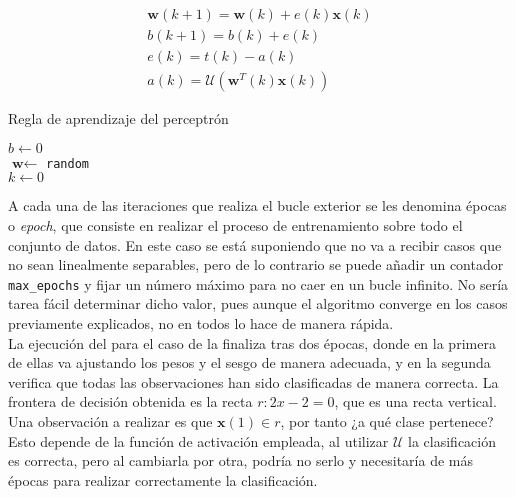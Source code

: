 		\begin{equation}
			\label{eq:perceptron}
			\begin{gathered}
				\textbf{w}(k+1) = \textbf{w}(k) + e(k)\textbf{x}(k)\\
				b(k+1) = b(k) + e(k)\\
				e(k) = t(k) - a(k)\\
				a(k) = \mathcal{U}(\textbf{w}^T(k)\textbf{x}(k))
			\end{gathered}
		\end{equation}
		
		
		\begin{algorithm}[!h]
			\DontPrintSemicolon
			
			\caption{Regla de aprendizaje del perceptrón}
			\label{algo:perceptron}
			
			$b \gets 0$\\
			$\textbf{w} \gets$ \texttt{random}\\
			$k \gets 0$\\
		\end{algorithm}
		
		A cada una de las iteraciones que realiza el bucle exterior se les denomina épocas o \textit{epoch}, que consiste en realizar el proceso de entrenamiento sobre todo el conjunto de datos. En este caso se está suponiendo que no va a recibir casos que no sean linealmente separables, pero de lo contrario se puede añadir un contador \texttt{max\_epochs} y fijar un número máximo para no caer en un bucle infinito. No sería tarea fácil determinar dicho valor, pues aunque el algoritmo converge en los casos previamente explicados, no en todos lo hace de manera rápida. \\
		
		La ejecución del  para el caso de la  finaliza tras dos épocas, donde en la primera de ellas va ajustando los pesos y el sesgo de manera adecuada, y en la segunda verifica que todas las observaciones han sido clasificadas de manera correcta. La frontera de decisión obtenida es la recta $r: 2x - 2 = 0$, que es una recta vertical. Una observación a realizar es que $\textbf{x}(1) \in r$, por tanto ¿a qué clase pertenece? Esto depende de la función de activación empleada, al utilizar $\mathcal{U}$ la clasificación es correcta, pero al cambiarla por otra, podría no serlo y necesitaría de más épocas para realizar correctamente la clasificación. \\
		
